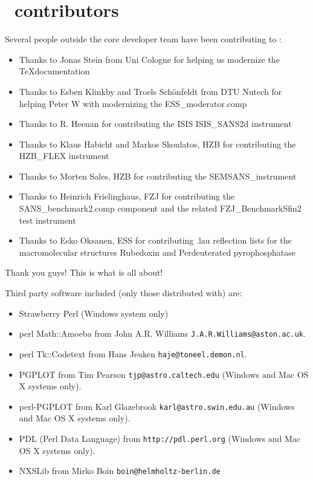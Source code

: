 \section*{\MCS \version\ contributors}
Several people outside the core developer team have been contributing
to \MCS \version:
\begin{itemize}
\item Thanks to Jonas Stein from Uni Cologne for helping us modernize the \TeX documentation
\item Thanks to Esben Klinkby and Troels Sch\"onfeldt from DTU Nutech for helping
  Peter W  with modernizing the ESS\_moderator.comp
\item Thanks to R. Heenan for contributing the ISIS ISIS\_SANS2d instrument 
\item Thanks to Klaus Habicht and Markos Skoulatos, HZB for
  contributing the HZB\_FLEX instrument
\item Thanks to Morten Sales, HZB  for contributing the SEMSANS\_instrument
\item Thanks to Heinrich Frielinghaus, FZJ for contributing the
  SANS\_benchmark2.comp component and the related FZJ\_BenchmarkSfin2
  test instrument
\item Thanks to Esko Oksanen, ESS for contributing .lau reflection
  lists for the macromolecular structures Rubedoxin and Perdeuterated pyrophosphatase
\end{itemize}
Thank you guys! This is what \MCS is all about!

Third party software included (only those distributed with) \MCS are:
\begin{itemize}
\item Strawberry Perl (Windows system only)
\item perl Math::Amoeba from John A.R. Williams \verb+J.A.R.Williams@aston.ac.uk+.
\item perl Tk::Codetext from Hans Jeuken \verb+haje@toneel.demon.nl+.
\item PGPLOT from Tim Pearson \verb+tjp@astro.caltech.edu+ (Windows
  and Mac OS X systems only).
\item perl-PGPLOT from Karl Glazebrook \verb+karl@astro.swin.edu.au+ (Windows
  and Mac OS X systems only).
\item PDL (Perl Data Language) from \verb+http://pdl.perl.org+ (Windows
  and Mac OS X systems only).
\item NXSLib from Mirko Boin \verb+boin@helmholtz-berlin.de+
\end{itemize}

